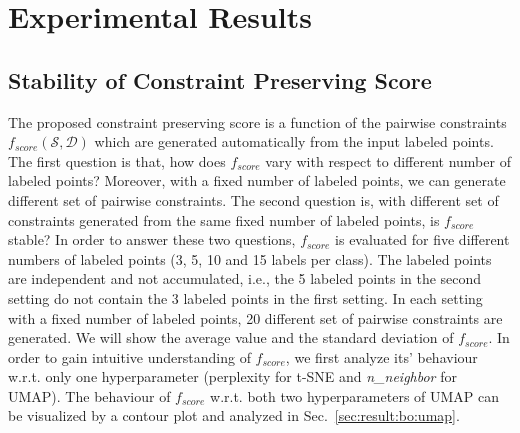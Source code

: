 \section{Experimental Results}\label{sec:results}

\subsection{Stability of Constraint Preserving Score}\label{sec:result:stability}

The proposed constraint preserving score is a function of the pairwise constraints $f_{score}(\mathcal{S}, \mathcal{D})$ which are generated automatically from the input labeled points.
The first question is that, how does $f_{score}$ vary with respect to different number of labeled points?
Moreover, with a fixed number of labeled points, we can generate different set of pairwise constraints.
The second question is, with different set of constraints generated from the same fixed number of labeled points, is $f_{score}$ stable?
In order to answer these two questions, $f_{score}$ is evaluated for five different numbers of labeled points (3, 5, 10 and 15 labels per class).
The labeled points are independent and not accumulated, i.e., the 5 labeled points in the second setting do not contain the 3 labeled points in the first setting.
In each setting with a fixed number of labeled points, 20 different set of pairwise constraints are generated.
We will show the average value and the standard deviation of $f_{score}$.
In order to gain intuitive understanding of $f_{score}$, we first analyze its' behaviour w.r.t. only one hyperparameter (perplexity for t-SNE and \emph{n\_neighbor} for UMAP).
The behaviour of $f_{score}$ w.r.t. both two hyperparameters of UMAP can be visualized by a contour plot and analyzed in Sec.~\ref{sec:result:bo:umap}. %

